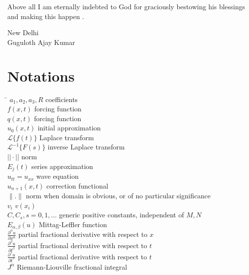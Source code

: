 \documentclass[12pt, a4paper]{report}
\begin{document}
Above all I am eternally indebted to God for graciously bestowing his blessings and making this happen \vspace{0.5cm}.

\begin{flushright}
    New Delhi\\
    Guguloth Ajay Kumar
\end{flushright}



\chapter*{Notations}
\begin{tabbing}
    \hspace{2in} \= \kill
    $a_1, a_2, a_3, R$ \> coefficients \\
    $f(x, t)$ \> forcing function \\
    $q(x, t)$ \> forcing function \\
    $u_0(x, t)$ \> initial approximation \\
    $\mathcal{L}\{f(t)\}$ \> Laplace transform \\
    $\mathcal{L}^{-1}\{F(s)\}$ \> inverse Laplace transform \\
    $|| \cdot ||$ \> norm \\
    $E_j(t)$ \> series approximation \\
    $u_{tt} = u_{xx}$ \> wave equation \\
    $u_{n+1}(x, t)$ \> correction functional \\
     $\|.\|$ \> norm when domain is obvious, or of no particular significance \\
    $v_i$ \> $v(x_i)$ \\
    $C, C_s, s = 0, 1, \ldots$ \> generic positive constants, independent of $M, N$ \\
    $E_{\alpha,\beta}(u)$ \> Mittag-Leffler function \\
    $\frac{\partial^\alpha u}{\partial x^\alpha}$ \> partial fractional derivative with respect to $x$ \\
    $\frac{\partial^\beta u}{\partial t^\beta}$ \> partial fractional derivative with respect to $t$ \\
    $\frac{\partial^\gamma u}{\partial t^\gamma}$ \> partial fractional derivative with respect to $t$ \\
    $J^\alpha$ \> Riemann-Liouville fractional integral \\

\end{tabbing}
\end{document}
